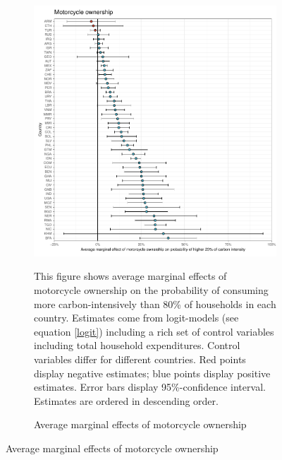  \begin{figure}[ht!]\ContinuedFloat
   \centering
   \begin{subfigure}[b]{\textwidth}
   \centering
   \caption{Average marginal effects of motorcycle ownership} \label{fig:Logit_ME_motorcycle}
   \includegraphics{1_Figures/Analysis_Logit_Models_Marginal_Effects/Average_Marginal_Effects_affected_upper_80_motorcycle.01_2017B.pdf}
   \begin{subcaption2}
     This figure shows average marginal effects of motorcycle ownership on the probability of consuming more carbon-intensively than 80\% of households in each country. Estimates come from logit-models (see equation \ref{logit}) including a rich set of control variables including total household expenditures. Control variables differ for different countries. Red points display negative estimates; blue points display positive estimates. Error bars display 95\%-confidence interval. Estimates are ordered in descending order.
   \end{subcaption2}
   \end{subfigure}
 \end{figure}
 \clearpage

